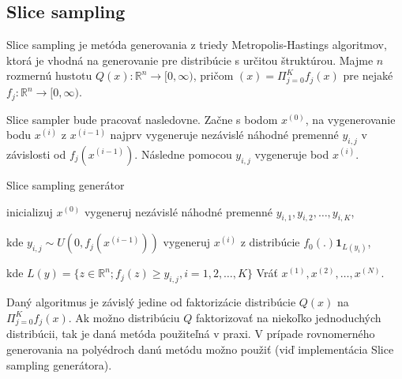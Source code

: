 \subsection{Slice sampling}

Slice sampling je metóda generovania z triedy Metropolis-Hastings algoritmov, ktorá je vhodná na generovanie pre distribúcie s určitou štruktúrou.
Majme $n$ rozmernú hustotu $Q(x): \mathbb{R}^n \rightarrow [0,\infty)$, pričom $(x) = \Pi^K_{j=0}f_j(x)$ pre nejaké $f_j: \mathbb{R}^n \rightarrow [0,\infty)$.

Slice sampler bude pracovať nasledovne. Začne s bodom $x^{(0)}$, na vygenerovanie bodu $x^{(i)}$ z $x^{(i-1)}$ najprv vygeneruje nezávislé náhodné premenné $y_{i,j}$ v závislosti od $f_j(x^{(i-1)})$. Následne pomocou $y_{i,j}$ vygeneruje bod $x^{(i)}$.

\begin{algorithm}[H]
	\caption{Slice sampling generátor \cite{slice_convergence_roberts}}
	\label{slice}
	\begin{algorithmic}[1]
		\State inicializuj $x^{(0)}$
			\State vygeneruj nezávislé náhodné premenné $y_{i,1},y_{i,2},\dots, y_{i,K}$,

			kde $y_{i,j} \sim U(0,f_j(x^{(i-1)}))$
			\State vygeneruj $x^{(i)}$ z distribúcie $f_0(.)\mathbf{1}_{L(y_{i})}$,

			kde $L(y)= \{ z \in \mathbb{R}^n; f_j(z) \geq y_{i,j}, i=1,2, \dots, K\}$
		\EndFor
		\State Vráť ${x^{(1)},x^{(2)},\dots,x^{(N)}}$.
	\end{algorithmic}
\end{algorithm}

Daný algoritmus je závislý jedine od faktorizácie distribúcie $Q(x)$ na $\Pi^K_{j=0}f_j(x)$. Ak možno distribúciu $Q$ faktorizovať na niekoľko jednoduchých distribúcii, tak je daná metóda použiteľná v praxi. V prípade rovnomerného generovania na polyédroch danú metódu možno použiť (viď implementácia Slice sampling generátora).


